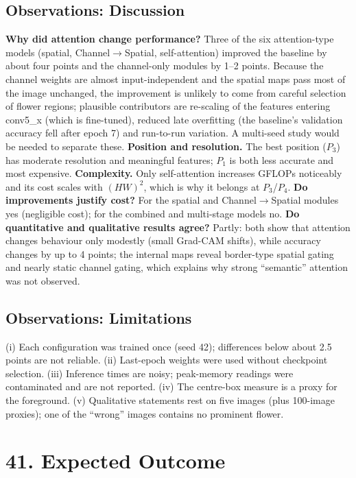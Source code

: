 \documentclass[10pt]{article}
\begin{document}
\subsection*{Observations: Discussion}
\textbf{Why did attention change performance?} Three of the six attention-type models (spatial, Channel$\to$Spatial, self-attention) improved the baseline by about four points and the channel-only modules by 1--2 points. Because the channel weights are almost input-independent and the spatial maps pass most of the image unchanged, the improvement is unlikely to come from careful selection of flower regions; plausible contributors are re-scaling of the features entering conv5\_x (which is fine-tuned), reduced late overfitting (the baseline's validation accuracy fell after epoch 7) and run-to-run variation. A multi-seed study would be needed to separate these.
\textbf{Position and resolution.} The best position ($P_3$) has moderate resolution and meaningful features; $P_1$ is both less accurate and most expensive. \textbf{Complexity.} Only self-attention increases GFLOPs noticeably and its cost scales with $(HW)^2$, which is why it belongs at $P_3$/$P_4$. \textbf{Do improvements justify cost?} For the spatial and Channel$\to$Spatial modules yes (negligible cost); for the combined and multi-stage models no. \textbf{Do quantitative and qualitative results agree?} Partly: both show that attention changes behaviour only modestly (small Grad-CAM shifts), while accuracy changes by up to 4 points; the internal maps reveal border-type spatial gating and nearly static channel gating, which explains why strong ``semantic'' attention was not observed.


\subsection*{Observations: Limitations}
(i) Each configuration was trained once (seed 42); differences below about 2.5 points are not reliable. (ii) Last-epoch weights were used without checkpoint selection. (iii) Inference times are noisy; peak-memory readings were contaminated and are not reported. (iv) The centre-box measure is a proxy for the foreground. (v) Qualitative statements rest on five images (plus 100-image proxies); one of the ``wrong'' images contains no prominent flower.


\section*{41. Expected Outcome}
\end{document}
